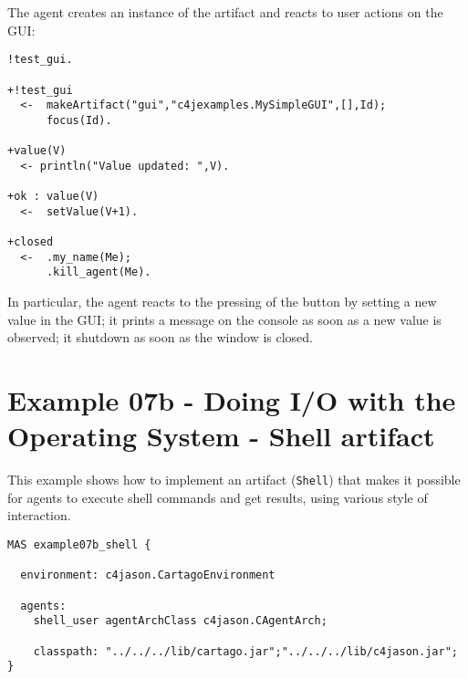 \documentclass[11pt]{report}
\begin{document}
%
\noindent The agent creates an instance of the artifact and reacts to user actions on the GUI:
%
{\small{\begin{verbatim}
!test_gui.

+!test_gui
  <-  makeArtifact("gui","c4jexamples.MySimpleGUI",[],Id);
      focus(Id).

+value(V) 
  <- println("Value updated: ",V).
  
+ok : value(V)
  <-  setValue(V+1).
      
+closed
  <-  .my_name(Me);
      .kill_agent(Me).
\end{verbatim}}}

%
\noindent In particular, the agent reacts to the pressing of the button by setting a new value in the GUI;
%
it prints a message on the console as soon as a new value is observed;
%
it shutdown as soon as the window is closed.



\newpage
\section{Example 07b - Doing I/O with the Operating System - Shell artifact}

This example shows how to implement an artifact (\texttt{Shell}) that makes  it possible for agents to execute shell commands and get  results, using various style of interaction.

%
\medskip

%
{\small{
\begin{verbatim}
MAS example07b_shell {

  environment: c4jason.CartagoEnvironment

  agents:
    shell_user agentArchClass c4jason.CAgentArch;
    
    classpath: "../../../lib/cartago.jar";"../../../lib/c4jason.jar";    
}
\end{verbatim}}}
\end{document}
